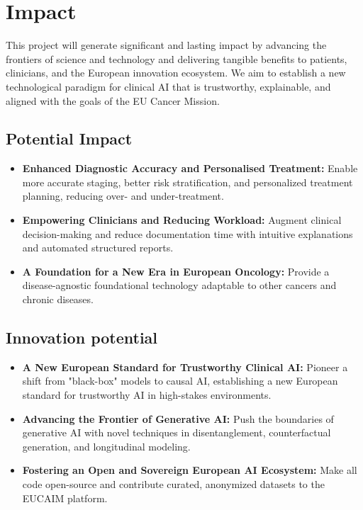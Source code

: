 \documentclass[11pt, a4paper]{article}
\begin{document}
\section{Impact}
This project will generate significant and lasting impact by advancing the frontiers of science and technology and delivering tangible benefits to patients, clinicians, and the European innovation ecosystem. We aim to establish a new technological paradigm for clinical AI that is trustworthy, explainable, and aligned with the goals of the EU Cancer Mission.

\subsection{Potential Impact}
\begin{itemize}
    \item \textbf{Enhanced Diagnostic Accuracy and Personalised Treatment:} Enable more accurate staging, better risk stratification, and personalized treatment planning, reducing over- and under-treatment.
    \item \textbf{Empowering Clinicians and Reducing Workload:} Augment clinical decision-making and reduce documentation time with intuitive explanations and automated structured reports.
    \item \textbf{A Foundation for a New Era in European Oncology:} Provide a disease-agnostic foundational technology adaptable to other cancers and chronic diseases.
\end{itemize}

\subsection{Innovation potential}
\begin{itemize}
    \item \textbf{A New European Standard for Trustworthy Clinical AI:} Pioneer a shift from "black-box" models to causal AI, establishing a new European standard for trustworthy AI in high-stakes environments.
    \item \textbf{Advancing the Frontier of Generative AI:} Push the boundaries of generative AI with novel techniques in disentanglement, counterfactual generation, and longitudinal modeling.
    \item \textbf{Fostering an Open and Sovereign European AI Ecosystem:} Make all code open-source and contribute curated, anonymized datasets to the EUCAIM platform.
\end{itemize}
\end{document}
